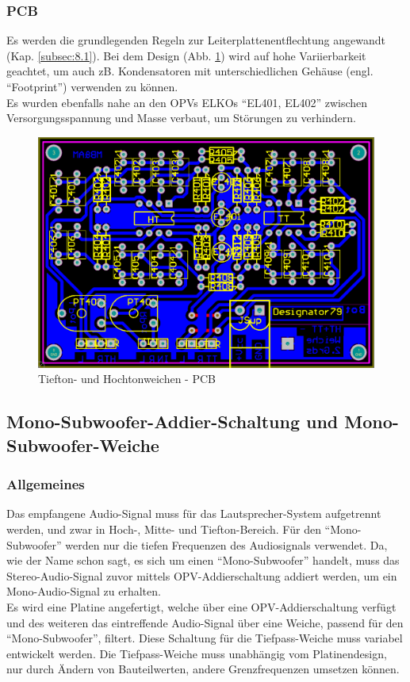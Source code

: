 \newpage
\subsubsection{PCB}\label{subsec:5.4.3}
Es werden die grundlegenden Regeln zur Leiterplattenentflechtung angewandt (Kap. \ref{subsec:8.1}).
Bei dem Design (Abb. \ref{fig:5.4.3.1}) wird auf hohe Variierbarkeit geachtet, um auch zB. Kondensatoren mit unterschiedlichen Gehäuse (engl. \enquote{Footprint}) verwenden zu können.\\
Es wurden ebenfalls nahe an den OPVs ELKOs \enquote{EL401, EL402} zwischen Versorgungsspannung und Masse verbaut, um Störungen zu verhindern.
\begin{figure} [H]
	\centering	
	\includegraphics[width=1\textwidth]{img/Print4/4_TTuHTWeiche-PCB.PNG}
	\caption{Tiefton- und Hochtonweichen - PCB}
	\label {fig:5.4.3.1}
\end{figure}


\newpage
\subsection*{Mono-Subwoofer-Addier-Schaltung und Mono-Subwoofer-Weiche}\label{sec:5.5}
\subsubsection{Allgemeines}\label{susec:5.5.1}
Das empfangene Audio-Signal muss für das Lautsprecher-System aufgetrennt werden, und zwar in Hoch-, Mitte- und Tiefton-Bereich.
Für den \enquote{Mono-Subwoofer} werden nur die tiefen Frequenzen des Audiosignals verwendet.
Da, wie der Name schon sagt, es sich um einen \enquote{Mono-Subwoofer} handelt, muss das Stereo-Audio-Signal zuvor mittels OPV-Addierschaltung addiert werden, um ein Mono-Audio-Signal zu erhalten.\\
Es wird eine Platine angefertigt, welche über eine OPV-Addierschaltung verfügt und des weiteren das eintreffende Audio-Signal über eine Weiche, passend für den \enquote{Mono-Subwoofer}, filtert.
Diese Schaltung für die Tiefpass-Weiche muss variabel entwickelt werden. Die Tiefpass-Weiche muss unabhängig vom Platinendesign, nur durch Ändern von Bauteilwerten, andere Grenzfrequenzen umsetzen können.

